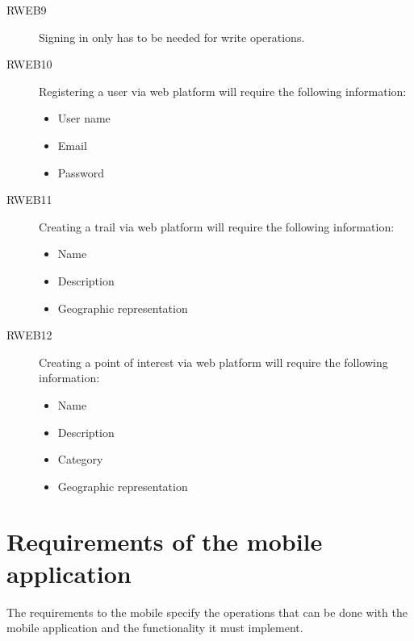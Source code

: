 \begin{description}
\item[RWEB9] Signing in only has to be needed for write operations.
\item[RWEB10] Registering a user via web platform will require the following information:
  \begin{itemize}
  \item User name
  \item Email
  \item Password
  \end{itemize}
\item[RWEB11] Creating a trail via web platform will require the following information:
  \begin{itemize}
  \item Name
  \item Description
  \item Geographic representation
  \end{itemize}
\item[RWEB12] Creating a point of interest via web platform will require the following information:
  \begin{itemize}
  \item Name
  \item Description
  \item Category
  \item Geographic representation
  \end{itemize}
    
\end{description}

\section{Requirements of the mobile application}

The requirements to the mobile specify the operations that can be done with the mobile application and the functionality it must implement.

